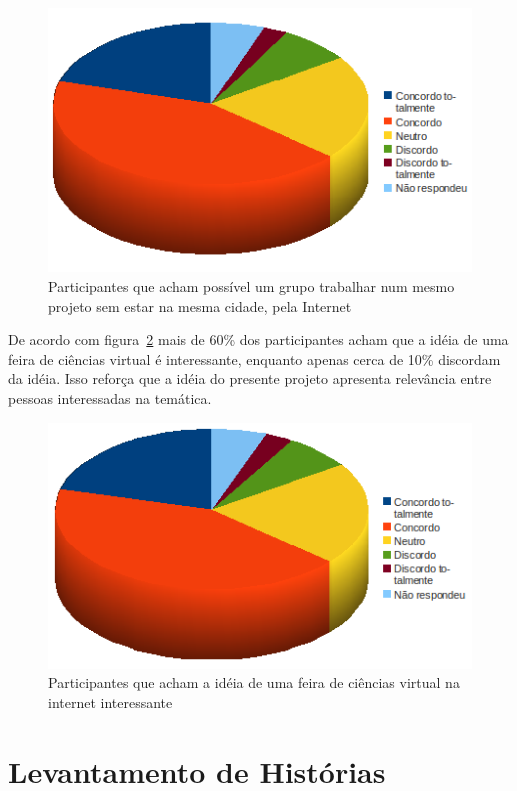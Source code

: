   \begin{figure}
      \begin{center}
	\includegraphics[width=0.7\linewidth]{arquivos/trabalho_online.png}
      \end{center}
      \caption{Participantes que acham possível um grupo trabalhar num mesmo projeto sem estar na mesma cidade, pela Internet}
      \label{trabalho_online}
  \end{figure}

  De acordo com figura~\ref{feira_virtual} mais de 60\% dos participantes acham que a idéia de uma feira de ciências virtual é interessante, enquanto 
apenas cerca de 10\% discordam da idéia. Isso reforça que a idéia do presente projeto apresenta relevância entre pessoas interessadas na temática.

  \begin{figure}
      \begin{center}
	\includegraphics[width=0.7\linewidth]{arquivos/feira_virtual.png}
      \end{center}
      \caption{Participantes que acham a idéia de uma feira de ciências virtual na internet interessante}
      \label{feira_virtual}
  \end{figure}

\section{Levantamento de Histórias}

